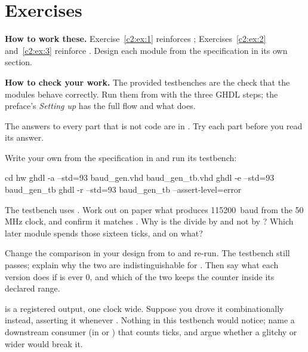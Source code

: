 
\section{Exercises}
\label{c2:sec:exercises}\label{c2:app:c}

\begin{aside}
\textbf{How to work these.} Exercise~\ref{c2:ex:1} reinforces ;
Exercises~\ref{c2:ex:2} and~\ref{c2:ex:3} reinforce . Design each module from
the specification in its own section.

\textbf{How to check your work.} The provided testbenches are the check that the modules behave
correctly. Run them from  with the three GHDL steps; the preface's \emph{Setting up} has
the full flow and what  does.

The answers to every part that is not code are in . Try each part before you read its
answer.
\end{aside}

\label{c2:ex:1}

 Write your own  from the specification in  and
run its testbench:

\begin{shell}
cd hw
ghdl -a --std=93 baud_gen.vhd baud_gen_tb.vhd
ghdl -e --std=93 baud_gen_tb
ghdl -r --std=93 baud_gen_tb --assert-level=error
\end{shell}

 The testbench uses . Work out on paper what  produces 115200~baud
from the 50\,MHz clock, and confirm it matches . Why is the divide by
 and not by ? Which later module spends those sixteen ticks, and on what?

 Change the comparison in your design from  to
 and re-run. The testbench still passes; explain why the two are
indistinguishable for . Then say what each version does if  is ever 0, and
which of the two keeps the counter inside its declared range.

  is a registered output, one clock wide. Suppose you drove it combinationally
instead, asserting it whenever . Nothing in this testbench would notice;
name a downstream consumer (in  or ) that counts ticks, and argue whether a
glitchy or wider  would break it.

